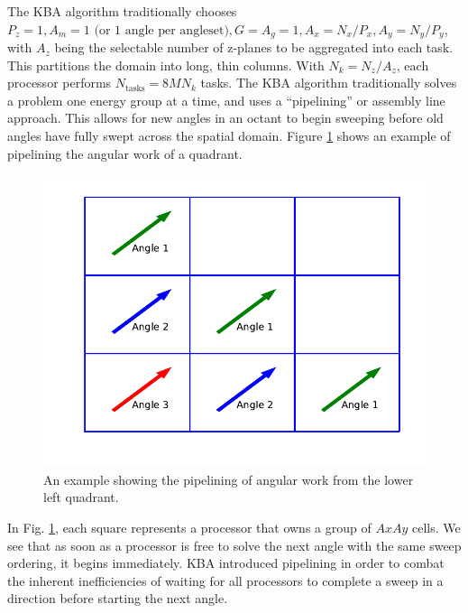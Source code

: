 The KBA algorithm traditionally chooses $P_z = 1, A_m = 1 \text{ (or 1 angle per angleset)}, G = A_g = 1, A_x = N_x/P_x, A_y = N_y/P_y$, with $A_z$ being the selectable number of z-planes to be aggregated into each task. This partitions the domain into long, thin columns. With $N_k = N_z/A_z$, each processor performs $N_{\text{tasks}} = 8MN_k$ tasks. The KBA algorithm traditionally solves a problem one energy group at a time, and uses a ``pipelining'' or assembly line approach. This allows for new angles in an octant to begin sweeping before old angles have fully swept across the spatial domain. Figure \ref{pipeline_example} shows an example of pipelining the angular work of a quadrant.

\begin{figure}[H]
\centering
\includegraphics[scale=0.75,trim={0cm 1cm 0cm 0cm},clip]{../figures/pipeline_example.pdf}
\caption{An example showing the pipelining of angular work from the lower left quadrant.}
\label{pipeline_example}
\end{figure}

In Fig. \ref{pipeline_example}, each square represents a processor that owns a group of $AxAy$ cells. We see that as soon as a processor is free to solve the next angle with the same sweep ordering, it begins immediately. KBA introduced pipelining in order to combat the inherent inefficiencies of waiting for all processors to complete a sweep in a direction before starting the next angle. 

